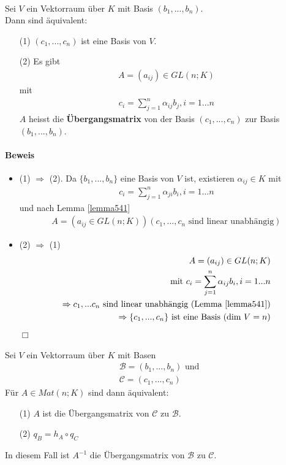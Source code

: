 \documentclass[11pt]{report}
\newcommand*\f[1] {\textbf{#1}}
\begin{document}
\begin{satz}
\label{satz542} {\ \\}
Sei $V$ ein Vektorraum über $K$ mit Basis $(b_1, ..., b_n)$.\\
Dann sind äquivalent:
\begin{itemize}
\item[(1)] $(c_1, ..., c_n)$ ist eine Basis von $V$.
\item[(2)] Es gibt 
\begin{align}
A = (a_{ij}) \in GL(n;K)
\end{align}
mit
\begin{align}
c_i = \sum_{j=1}^{n} \alpha_{ij} b_j, i=1...n
\end{align}
$A$ heisst die \f{Übergangsmatrix} von der Basis $(c_1, ..., c_n)$ zur Basis $(b_1, ..., b_n)$.
\end{itemize}
\end{satz}

\paragraph{Beweis}
\begin{itemize}
\item (1) $\Rightarrow$ (2). Da $\{b_1, ..., b_n\}$ eine Basis von $V$ ist, existieren $\alpha_{ij} \in K$ mit
\begin{align}
c_i = \sum_{j=1}^{n} \alpha_{ji} b_i, i=1...n
\end{align}
und nach Lemma \ref{lemma541}
\begin{align}
A = (a_{ij} \in GL(n;K)) (c_1, ..., c_n \text{ sind linear unabhängig})
\end{align}

\item (2) $\Rightarrow$ (1)
\begin{align}
A = (a_{ij}) \in GL(n;K) \\
\text{mit } c_i = \sum_{j=1}^{n} \alpha_{ij} b_i, i = 1...n \\
\Rightarrow c_1, ... c_n \text{ sind linear unabhängig (Lemma \ref{lemma541})} \\
\Rightarrow \{c_1, ..., c_n\} \text{ ist eine Basis (dim $V = n$)}
\end{align}
\hspace*{1cm} \hfill $\Box$
\end{itemize}

\begin{satz}
\label{satz543}
Sei $V$ ein Vektorraum über $K$ mit Basen
\begin{align}
\mathcal{B} = (b_1, ..., b_n) \text{ und} \\
\mathcal{C} = (c_1, ..., c_n)
\end{align}
Für $A \in Mat(n;K)$ sind dann äquivalent:
\begin{itemize}
 \item[(1)] $A$ ist die Übergangsmatrix von $\mathcal{C}$ zu $\mathcal{B}$.
 \item[(2)] $q_B = h_A \circ q_C$
\end{itemize}
In diesem Fall ist $A^{-1}$ die Übergangsmatrix von $\mathcal{B}$ zu $\mathcal{C}$.
\end{satz}
\newpage
\end{document}
